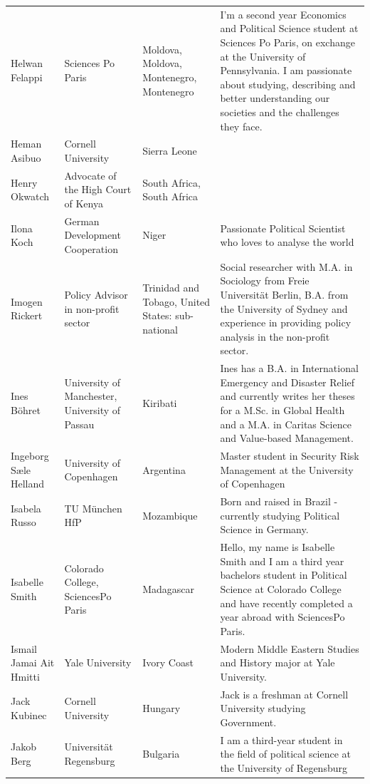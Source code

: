\documentclass[]{article}
\begin{document}
\begin{longtable}{l>{\raggedright\arraybackslash}p{2cm}>{\raggedright\arraybackslash}p{2cm}>{\raggedright\arraybackslash}p{3cm}}
\addlinespace
\rowcolor{gray!6}  Helwan Felappi & Sciences Po Paris & Moldova, Moldova, Montenegro, Montenegro & I'm a second year Economics and Political Science student at Sciences Po Paris, on exchange at the University of Pennsylvania. I am passionate about studying, describing and better understanding our societies and the challenges they face.\\
Heman Asibuo & Cornell University & Sierra Leone & \\
\rowcolor{gray!6}  Henry Okwatch & Advocate of the High Court of Kenya & South Africa, South Africa & \\
Ilona Koch & German Development Cooperation & Niger & Passionate Political Scientist who loves to analyse the world\\
\rowcolor{gray!6}  Imogen Rickert & Policy Advisor in non-profit sector & Trinidad and Tobago, United States: sub-national & Social researcher with M.A. in Sociology from Freie Universität Berlin, B.A. from the University of Sydney and experience in providing policy analysis in the non-profit sector.\\
\addlinespace
Ines Böhret & University of Manchester, University of Passau & Kiribati & Ines has a B.A. in International Emergency and Disaster Relief and currently writes her theses for a M.Sc. in Global Health and a M.A. in Caritas Science and Value-based Management.\\
\rowcolor{gray!6}  Ingeborg Sæle Helland & University of Copenhagen & Argentina & Master student in Security Risk Management at the University of Copenhagen\\
Isabela Russo & TU München HfP & Mozambique & Born and raised in Brazil - currently studying Political Science in Germany.\\
\rowcolor{gray!6}  Isabelle Smith & Colorado College, SciencesPo Paris & Madagascar & Hello, my name is Isabelle Smith and I am a third year bachelors student in Political Science at Colorado College and have recently completed a year abroad with SciencesPo Paris.\\
Ismail Jamai Ait Hmitti & Yale University & Ivory Coast & Modern Middle Eastern Studies and History major at Yale University.\\
\addlinespace
\rowcolor{gray!6}  Jack Kubinec & Cornell University & Hungary & Jack is a freshman at Cornell University studying Government.\\
Jakob Berg & Universität Regensburg & Bulgaria & I am a third-year student in the field of political science at the University of Regensburg\\

\end{longtable}
\end{document}
